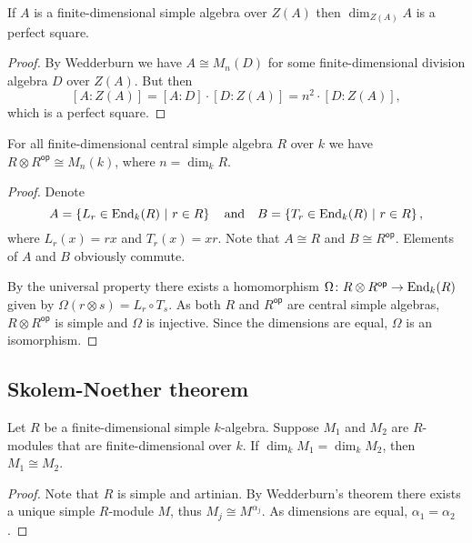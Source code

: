 \begin{posledica}
If $A$ is a finite-dimensional simple algebra over $Z(A)$ then
$\dim_{Z(A)} A$ is a perfect square.
\end{posledica}

\begin{proof}
By Wedderburn we have $A \cong M_n(D)$ for some finite-dimensional
division algebra $D$ over $Z(A)$. But then
\[
[A : Z(A)] = [A : D] \cdot [D : Z(A)] = n^2 \cdot [D : Z(A)],
\]
which is a perfect square.
\end{proof}

\begin{trditev}
For all finite-dimensional central simple algebra $R$ over $k$ we
have $R \otimes R^{\mathsf{op}} \cong M_n(k)$, where
$n = \dim_k R$.
\end{trditev}

\begin{proof}
Denote
\[
A = \left\{L_r \in \operatorname{End}_k(R)~\middle\vert~r \in R\right\}
\quad \text{and} \quad
B = \left\{T_r \in \operatorname{End}_k(R)~\middle\vert~r \in R\right\},
\]
where $L_r(x) = rx$ and $T_r(x) = xr$. Note that $A \cong R$ and
$B \cong R^{\mathsf{op}}$. Elements of $A$ and $B$ obviously
commute.

By the universal property there exists a homomorphism
$\Omega \colon R \otimes R^{\mathsf{op}} \to \operatorname{End}_k(R)$ given by
$\Omega(r \otimes s) = L_r \circ T_s$. As both $R$ and
$R^{\mathsf{op}}$ are central simple algebras,
$R \otimes R^{\mathsf{op}}$ is simple and $\Omega$ is injective.
Since the dimensions are equal, $\Omega$ is an isomorphism.
\end{proof}

\newpage

\subsection{Skolem-Noether theorem}

\begin{lema}
Let $R$ be a finite-dimensional simple $k$-algebra. Suppose $M_1$
and $M_2$ are $R$-modules that are finite-dimensional over $k$. If
$\dim_k M_1 = \dim_k M_2$, then $M_1 \cong M_2$.
\end{lema}

\begin{proof}
Note that $R$ is simple and artinian. By Wedderburn's theorem there
exists a unique simple $R$-module $M$, thus
$M_j \cong M^{\alpha_j}$. As dimensions are equal,
$\alpha_1 = \alpha_2$.
\end{proof}


